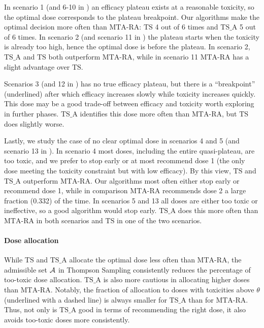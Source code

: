 In scenario 1 (and 6-10 in ) an efficacy plateau exists at a reasonable toxicity, so the optimal dose corresponds to the plateau breakpoint. Our algorithms make the optimal decision more often than $\mathrm{MTA}$-$\mathrm{RA}$: $\mathrm{TS}$ 4 out of 6 times and $\mathrm{TS}\_\mathrm{A}$ 5 out of 6 times. In scenario 2 (and scenario 11 in ) the plateau starts when the toxicity is already too high, hence the optimal dose is before the plateau. In scenario 2,  $\mathrm{TS}\_\mathrm{A}$ and $\mathrm{TS}$ both outperform $\mathrm{MTA}$-$\mathrm{RA}$, while in scenario 11 $\mathrm{MTA}$-$\mathrm{RA}$ has a slight advantage over $\mathrm{TS}$. 

Scenarios 3 (and 12 in ) has no true efficacy plateau, but there is a ``breakpoint'' (underlined) after which efficacy increases slowly while toxicity increases quickly. This dose may be a good trade-off between efficacy and toxicity worth exploring in further phases. $\mathrm{TS}\_\mathrm{A}$ identifies this dose more often than $\mathrm{MTA}$-$\mathrm{RA}$, but $\mathrm{TS}$ does slightly worse. 

Lastly, we study the case of no clear optimal dose in scenarios 4 and 5 (and scenario 13 in ). In scenario 4 most doses, including the entire quasi-plateau, are too toxic, and we prefer to stop early or at most recommend dose 1 (the only dose meeting the toxicity constraint but with low efficacy). By this view, $\mathrm{TS}$ and $\mathrm{TS}\_\mathrm{A}$ outperform $\mathrm{MTA}$-$\mathrm{RA}$. Our algorithms most often either stop early or recommend dose 1, while in comparison $\mathrm{MTA}$-$\mathrm{RA}$ recommends dose 2 a large fraction (0.332) of the time. In scenarios 5 and 13 all doses are either too toxic or ineffective, so a good algorithm would stop early. %
$\mathrm{TS}\_\mathrm{A}$ does this more often than $\mathrm{MTA}$-$\mathrm{RA}$ in both scenarios and $\mathrm{TS}$ in one of the two scenarios. 



\paragraph{Dose allocation}
While $\mathrm{TS}$ and $\mathrm{TS}\_\mathrm{A}$ allocate the optimal dose less often than $\mathrm{MTA}$-$\mathrm{RA}$, the admissible set $\mathcal{A}$ in Thompson Sampling consistently reduces the percentage of too-toxic dose allocation. $\mathrm{TS}\_\mathrm{A}$ is also more cautious in allocating higher doses than $\mathrm{MTA}$-$\mathrm{RA}$. Notably, the fraction of allocation to doses with toxicities above $\theta$ (underlined with a dashed line) is always smaller for $\mathrm{TS}\_\mathrm{A}$ than for $\mathrm{MTA}$-$\mathrm{RA}$. Thus, not only is $\mathrm{TS}\_\mathrm{A}$ good in terms of recommending the right dose, it also avoids too-toxic doses more consistently.

